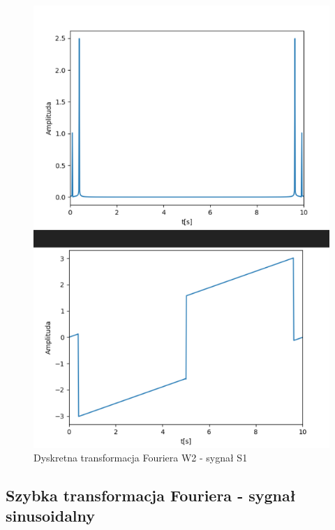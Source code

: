 \documentclass[12pt]{article}
\begin{document}
\begin{figure}[H]
\centering
\includegraphics[scale=0.6]{s1DyskrW2.png}
\caption{Dyskretna transformacja Fouriera W2 - sygnał S1}
\end{figure} 

\subsection{Szybka transformacja Fouriera - sygnał sinusoidalny}
\end{document}
